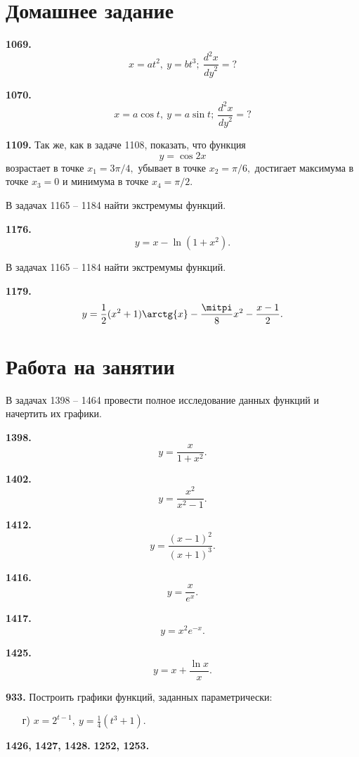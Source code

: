 \documentclass[a4paper,10pt]{article}
\newcommand{\exercize}[1]{\textbf{#1.}}
\begin{document}
\section{Домашнее задание}

\exercize{1069} \[ x = a t^2,\ y = b t^3;\ \frac{d^2 x}{{dy}^2} = ? \]

\exercize{1070} \[ x = a \cos{t},\ y = a \sin{t};\ \frac{d^2 x}{{dy}^2} = ? \]

\exercize{1109} Так же, как в задаче 1108, показать, что функция 
\[ y = \cos{2 x} \]
возрастает в точке $x_1 = 3 \pi / 4,$ убывает в точке $x_2 = \pi / 6,$ достигает максимума в точке $x_3 = 0$ и минимума в точке $x_4 = \pi / 2.$

В задачах 1165 -- 1184 найти экстремумы функций.

\exercize{1176} \[ y = x - \ln{(1 + x^2)}. \]


В задачах 1165 -- 1184 найти экстремумы функций.

\exercize{1179} \[ y = \frac{1}{2}(x^2 + 1) \arctg{x} - \frac{\pi}{8}x^2 - \frac{x - 1}{2}. \]

\section{Работа на занятии}

В задачах 1398 -- 1464 провести полное исследование данных функций и начертить их графики.

\exercize{1398} \[ y = \frac{x}{1 + x^2}. \]

\exercize{1402} \[ y = \frac{x^2}{x^2 - 1}. \]

\exercize{1412} \[ y = \frac{(x - 1)^2}{(x + 1)^3}. \]

\exercize{1416} \[ y = \frac{x}{e^x}. \]

\exercize{1417} \[ y = x^2 e^{-x}. \]

\exercize{1425} \[ y = x + \frac{\ln{x}}{x}. \]

\exercize{933} Построить графики функций, заданных параметрически:
\begin{itemize}
\item[г)] $x = 2^{t - 1},\ y = \frac{1}{4}(t^3 + 1).$
\end{itemize}

\exercize{1426, 1427, 1428}
\exercize{1252, 1253}
\end{document}
